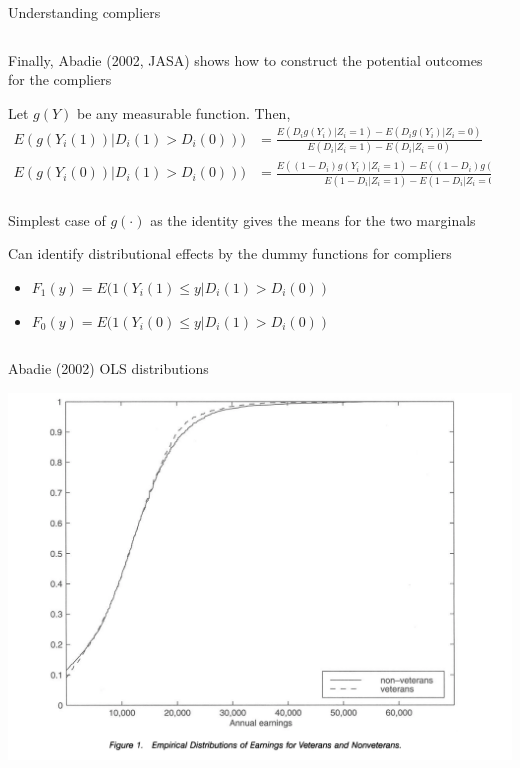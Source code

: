 \documentclass[notes,11pt, aspectratio=169]{beamer}
\newenvironment{wideitemize}{\itemize\addtolength{\itemsep}{10pt}}{\enditemize}
\begin{document}
\begin{frame}{Understanding compliers}
  \begin{columns}[T] %
    \begin{column}{0.9\textwidth}
      \begin{wideitemize}
      \item Finally, Abadie (2002, JASA)  shows how to construct the potential outcomes for the compliers
      \item Let $g(Y)$ be any measurable function. Then,
        \begin{align*}
         E(g(Y_{i}(1)) | D_{i}(1) > D_{i}(0))) &= \frac{E(D_{i}g(Y_{i})|Z_{i} = 1) - E(D_{i}g(Y_{i})|Z_{i} = 0)}{E(D_{i}|Z_{i} = 1) - E(D_{i}|Z_{i}=0)}\\
         E(g(Y_{i}(0)) | D_{i}(1) > D_{i}(0))) &= \frac{E((1-D_{i})g(Y_{i})|Z_{i} = 1) - E((1-D_{i})g(Y_{i})|Z_{i} = 0)}{E(1-D_{i}|Z_{i} = 1) - E(1-D_{i}|Z_{i}=0)}\\
        \end{align*}
      \item Simplest case of $g(\cdot)$ as the identity gives the means for the two marginals
      \item Can identify distributional effects by the
        dummy functions for compliers
        \begin{itemize}
        \item         $F_{1}(y) = E(1(Y_{i}(1) \leq y | D_{i}(1) > D_{i}(0))$
        \item         $F_{0}(y) = E(1(Y_{i}(0) \leq y | D_{i}(1) > D_{i}(0))$
        \end{itemize}
      \end{wideitemize}
\end{column}
\begin{column}{0.3\textwidth}
\end{column}
\end{columns}
\end{frame}

\begin{frame}{Abadie (2002) OLS distributions}
  \begin{center}
    \includegraphics[width=0.7\linewidth]{images/abadie_kappa1.png}
  \end{center}
\end{frame}
\end{document}
